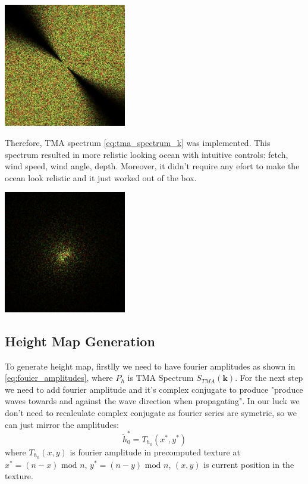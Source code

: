 \begin{minipage}{1\textwidth}
    \centering
    \includegraphics[width=0.4\textwidth]{"images/phillips_spectrum.png"}
    \label{fig:phillips_spectrum}
\end{minipage}

Therefore, TMA spectrum \ref{eq:tma_spectrum_k} was implemented. This spectrum resulted in more relistic looking ocean with intuitive controls: fetch, wind speed, wind angle, depth. Moreover, it didn't require any efort to make the ocean look relistic and it just worked out of the box.
\begin{minipage}{1\textwidth}
    \centering
    \includegraphics[width=0.40\textwidth]{"images/tma_spectrum.png"}
    \label{fig:tma_spectrum}
\end{minipage}

\subsection{Height Map Generation}

To generate height map, firstlly we need to have fourier amplitudes as shown in \ref{eq:fouier_amplitudes}, where $P_h$ is TMA Spectrum $S_{TMA}(\mathbf{k})$.
For the next step we need to add fourier amplitude and it's complex conjugate to produce "produce waves towards and against the wave direction when propagating"\cite{horvath2015}.
In our luck we don't need to recalculate complex conjugate as fourier series are symetric, so we can just mirror the amplitudes:
\begin{equation}
    \tilde{h}^{*}_0 = T_{h_0}(x^{*}, y^{*})
\end{equation}
where $T_{h_0}(x, y)$ is fourier amplitude in precomputed texture at $x^{*} = (n - x) \text{ mod } n$, $y^{*} = (n - y) \text{ mod } n$, $(x, y)$ is current position in the texture.


